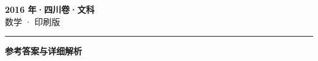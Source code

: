 \documentclass[zihao=5, a4paper]{ctexart}
\begin{document}
\begin{center}
  {\Large\bfseries 2016 年·四川卷·文科}\\[4pt]
  {\large 数学 · 印刷版}
\end{center}
\medskip
{}

\par\bigskip\hrule\bigskip
{}
\begin{center}{\large\bfseries 参考答案与详细解析}\end{center}
\smallskip

\end{document}
